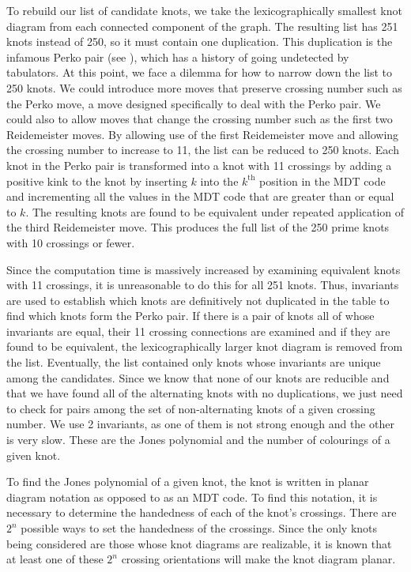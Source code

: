 \begin{paper}
To rebuild our list of candidate knots, we take the lexicographically smallest
knot diagram from each connected component of the graph.
The resulting list has 251 knots instead of 250, so it must contain one
duplication.
This duplication is the infamous Perko pair (see \figPerko), which has a
history of going undetected by tabulators.
At this point, we face a dilemma for how to narrow down the list to 250 knots.
We could introduce more moves that preserve crossing number such as the Perko
move, a move designed specifically to deal with the Perko pair.
We could also to allow moves that change the crossing number such as the first
two Reidemeister moves.
By allowing use of the first Reidemeister move and allowing the crossing number
to increase to 11, the list can be reduced to 250 knots.
Each knot in the Perko pair is transformed into a knot with 11 crossings by
adding a positive kink to the knot by inserting $k$ into the $k^\text{th}$
position in the MDT code and incrementing all the values in the MDT code that
are greater than or equal to $k$.
The resulting knots are found to be equivalent under repeated application of the
third Reidemeister move.
This produces the full list of the 250 prime knots with 10 crossings or fewer.


Since the computation time is massively increased by examining equivalent knots
with 11 crossings, it is unreasonable to do this for all 251 knots.
Thus, invariants are used to establish which knots are definitively not
duplicated in the table to find which knots form the Perko pair.
If there is a pair of knots all of whose invariants are equal, their 11 crossing
connections are examined and if they are found to be equivalent, the
lexicographically larger knot diagram is removed from the list.
Eventually, the list contained only knots whose invariants are unique among the
candidates.
Since we know that none of our knots are reducible and that we have found all of
the alternating knots with no duplications, we just need to check for pairs
among the set of non-alternating knots of a given crossing number.
We use 2 invariants, as one of them is not strong enough and the other is very
slow.
These are the Jones polynomial and the number of colourings of a given knot.


To find the Jones polynomial of a given knot, the knot is written in planar
diagram notation as opposed to as an MDT code.
To find this notation, it is necessary to determine the handedness of each of
the knot's crossings.
There are $2^n$ possible ways to set the handedness of the crossings.
Since the only knots being considered are those whose knot diagrams are
realizable, it is known that at least one of these $2^n$ crossing orientations
will make the knot diagram planar.


\end{paper}
